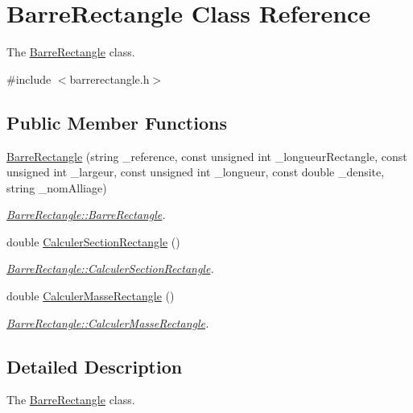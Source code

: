 \hypertarget{class_barre_rectangle}{}\section{Barre\+Rectangle Class Reference}
\label{class_barre_rectangle}


The \hyperlink{class_barre_rectangle}{Barre\+Rectangle} class.  




{\ttfamily \#include $<$barrerectangle.\+h$>$}

\subsection*{Public Member Functions}
\begin{DoxyCompactItemize}
\item 
\hyperlink{class_barre_rectangle_a8c101cc9f152c621d1c70614e42faf8e}{Barre\+Rectangle} (string \+\_\+reference, const unsigned int \+\_\+longueur\+Rectangle, const unsigned int \+\_\+largeur, const unsigned int \+\_\+longueur, const double \+\_\+densite, string \+\_\+nom\+Alliage)
\begin{DoxyCompactList}\small\item\em \hyperlink{class_barre_rectangle_a8c101cc9f152c621d1c70614e42faf8e}{Barre\+Rectangle\+::\+Barre\+Rectangle}. \end{DoxyCompactList}\item 
double \hyperlink{class_barre_rectangle_a73b3dffd34d10e478d5af2b2dd3c1a64}{Calculer\+Section\+Rectangle} ()
\begin{DoxyCompactList}\small\item\em \hyperlink{class_barre_rectangle_a73b3dffd34d10e478d5af2b2dd3c1a64}{Barre\+Rectangle\+::\+Calculer\+Section\+Rectangle}. \end{DoxyCompactList}\item 
double \hyperlink{class_barre_rectangle_a7cff34b806c27adce7118384f06f71c7}{Calculer\+Masse\+Rectangle} ()
\begin{DoxyCompactList}\small\item\em \hyperlink{class_barre_rectangle_a7cff34b806c27adce7118384f06f71c7}{Barre\+Rectangle\+::\+Calculer\+Masse\+Rectangle}. \end{DoxyCompactList}\end{DoxyCompactItemize}


\subsection{Detailed Description}
The \hyperlink{class_barre_rectangle}{Barre\+Rectangle} class. 

